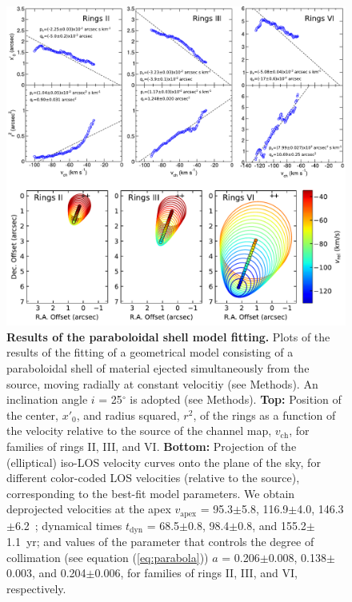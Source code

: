 \documentclass[12pt]{mythesis}
\begin{document}
\begin{figure}[p!]
\begin{center}
\includegraphics[width=\textwidth]{figures/paraboloid_fits.pdf} 
\caption[Results of the paraboloidal shell model fitting.]{{\bf Results of the paraboloidal shell model fitting.} Plots of the results of the fitting of a geometrical model consisting of a paraboloidal shell of material ejected simultaneously from the source, moving radially at constant velocitiy (see Methods). An inclination angle $i$ = 25$^\circ$ is adopted (see Methods). {\bf Top:} Position of the center, $x'_0$, and radius squared, $r^2$, of the rings as a function of the velocity relative to the source of the channel map, $v_\mathrm{ch}$, for families of rings II, III, and VI. {\bf Bottom:} Projection of the (elliptical) iso-LOS velocity curves onto the plane of the sky, for different color-coded LOS velocities (relative to the source), corresponding to the best-fit model parameters.
 We obtain deprojected velocities at the apex $v_\mathrm{apex}$ = 95.3$\pm$5.8, 116.9$\pm$4.0, 146.3$\pm$6.2~\kms; dynamical times $t_\mathrm{dyn}$ = 68.5$\pm$0.8, 98.4$\pm$0.8, and 155.2$\pm$1.1~yr; and values of the parameter that controls the degree of collimation (see equation (\ref{eq:parabola})) $a$ = 0.206$\pm$0.008, 0.138$\pm$0.003, and 0.204$\pm$0.006, for families of rings II, III, and VI, respectively.}
\label{fig:parafit}
\end{center}
\end{figure}
\end{document}
